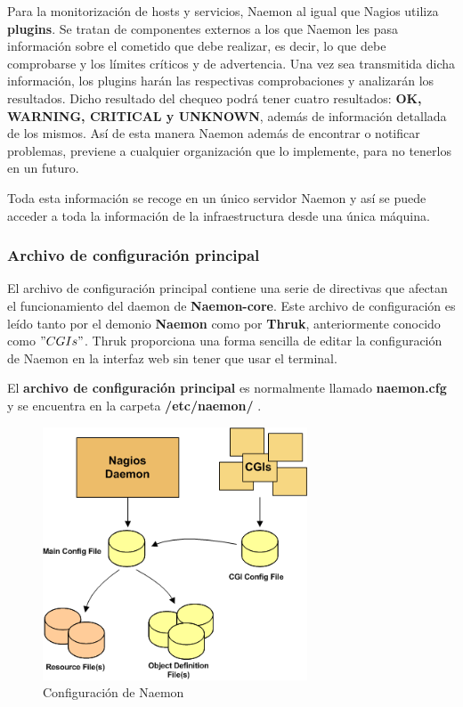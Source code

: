 Para la monitorización de hosts y servicios, Naemon al igual que Nagios utiliza \textbf{plugins}. Se tratan de componentes externos a los que Naemon les pasa información sobre el cometido que debe realizar, es decir, lo que debe comprobarse y los límites críticos y de advertencia. Una vez sea transmitida dicha información, los plugins harán las respectivas comprobaciones y analizarán los resultados.
\newpage
Dicho resultado del chequeo podrá tener cuatro resultados: \textbf{OK, WARNING, CRITICAL y UNKNOWN}, además de información detallada de los mismos. Así de esta manera Naemon además de encontrar o notificar problemas, previene a cualquier organización que lo implemente, para no tenerlos en un futuro.

Toda esta información se recoge en un único servidor Naemon y así se puede acceder a toda la información de la infraestructura desde una única máquina.
\subsubsection{Archivo de configuración principal}
El archivo de configuración principal contiene una serie de directivas que afectan el funcionamiento del daemon de \textbf{Naemon-core}. Este archivo de configuración es leído tanto por el demonio \textbf{Naemon} como por \textbf{Thruk}, anteriormente conocido como \textbf{$"CGIs"$}. Thruk proporciona una forma sencilla de editar la configuración de Naemon en la interfaz web sin tener que usar el terminal.

El \textbf{archivo de configuración principal} es normalmente llamado \textbf{naemon.cfg} y se encuentra en la carpeta \textbf{/etc/naemon/} \cite{naemoncfg}.

\begin{figure}[H]
	\centering
	\includegraphics[width=0.7\textwidth]{imagenes/main_configuring/main_configuring.png}
	\caption{Configuración de Naemon\cite{config}}\label{configuration}
\end{figure}


